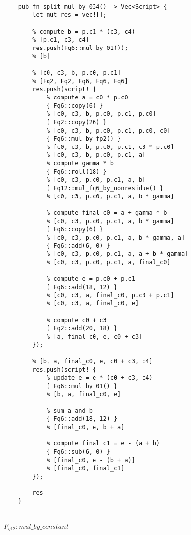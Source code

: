 \begin{lstlisting}

    pub fn split_mul_by_034() -> Vec<Script> {
        let mut res = vec![];

        % compute b = p.c1 * (c3, c4)
        % [p.c1, c3, c4]
        res.push(Fq6::mul_by_01());
        % [b]

        % [c0, c3, b, p.c0, p.c1]
        % [Fq2, Fq2, Fq6, Fq6, Fq6]
        res.push(script! {
            % compute a = c0 * p.c0
            { Fq6::copy(6) }
            % [c0, c3, b, p.c0, p.c1, p.c0]
            { Fq2::copy(26) }
            % [c0, c3, b, p.c0, p.c1, p.c0, c0]
            { Fq6::mul_by_fp2() }
            % [c0, c3, b, p.c0, p.c1, c0 * p.c0]
            % [c0, c3, b, p.c0, p.c1, a]
            % compute gamma * b
            { Fq6::roll(18) }
            % [c0, c3, p.c0, p.c1, a, b]
            { Fq12::mul_fq6_by_nonresidue() }
            % [c0, c3, p.c0, p.c1, a, b * gamma]

            % compute final c0 = a + gamma * b
            % [c0, c3, p.c0, p.c1, a, b * gamma]
            { Fq6::copy(6) }
            % [c0, c3, p.c0, p.c1, a, b * gamma, a]
            { Fq6::add(6, 0) }
            % [c0, c3, p.c0, p.c1, a, a + b * gamma]
            % [c0, c3, p.c0, p.c1, a, final_c0]

            % compute e = p.c0 + p.c1
            { Fq6::add(18, 12) }
            % [c0, c3, a, final_c0, p.c0 + p.c1]
            % [c0, c3, a, final_c0, e]

            % compute c0 + c3
            { Fq2::add(20, 18) }
            % [a, final_c0, e, c0 + c3]
        });

        % [b, a, final_c0, e, c0 + c3, c4]
        res.push(script! {
            % update e = e * (c0 + c3, c4)
            { Fq6::mul_by_01() }
            % [b, a, final_c0, e]

            % sum a and b
            { Fq6::add(18, 12) }
            % [final_c0, e, b + a]

            % compute final c1 = e - (a + b)
            { Fq6::sub(6, 0) }
            % [final_c0, e - (b + a)]
            % [final_c0, final_c1]
        });

        res
    }
    
\end{lstlisting}


\paragraph*{$F_{q12}: mul\_by\_constant$}

